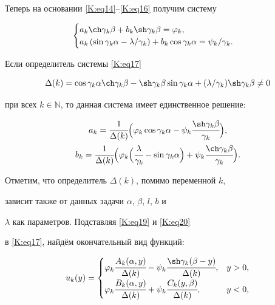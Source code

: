 Теперь на основании \eqref{K:eq14}--\eqref{K:eq16} получим систему

\begin{equation}

\label{K:eq17}

\begin{cases}

a_k \ch \gamma_k \beta + b_k \sh \gamma_k \beta =\varphi_k,\\

a_k\left(\sin \gamma_k \alpha -\lambda/{\gamma_k} \right) +b_k \cos \gamma_k \alpha ={\psi_k}/{\gamma_k}.

\end{cases}

\end{equation}

Если определитель системы \eqref{K:eq17}

\begin{equation}

\label{K:eq18}

\Delta (k) = \cos \gamma_k \alpha \ch \gamma_k \beta -\sh \gamma_k \beta \sin \gamma_k \alpha +({\lambda}/{\gamma_k}) \sh \gamma_k \beta \neq 0

\end{equation}

при всех $k \in \mathbb{N}$, то данная система имеет единственное решение:

\begin{gather}

\label{K:eq19}

a_k=\cfrac{1}{\Delta (k)} \Bigl(\varphi_k \cos \gamma_k \alpha -\psi_k \cfrac{\sh \gamma_k \beta}{\gamma_k} \Bigr),\\

\label{K:eq20}

b_k = \cfrac{1}{\Delta (k)} \Bigl(\varphi_k\Bigl( \cfrac{\lambda}{\gamma_k} -\sin \gamma_k \alpha \Bigr) + \psi_k \cfrac{\ch \gamma_k \beta}{\gamma_k} \Bigr).

\end{gather}

Отметим, что определитель $\Delta(k)$, помимо переменной $k$,

зависит также от данных задачи $\alpha$, $\beta$, $l$, $b$ и

$\lambda$ как параметров. Подставляя \eqref{K:eq19} и \eqref{K:eq20} 

в \eqref{K:eq17}, найдём окончательный вид функций:

\begin{equation}

\label{K:eq21}

u_k(y)=\begin{cases}

\varphi_k\cfrac{A_k (\alpha, y)}{\Delta (k)} - \psi_k \cfrac{\sh \gamma_k(\beta -y)}{\Delta(k)}, & y>0,\\[2mm]

\varphi_k\cfrac{B_k (\alpha, y)}{\Delta (k)} + \psi_k \cfrac{C_k(y,\beta)}{\Delta(k)}, & y<0,

\end{cases}

\end{equation}

